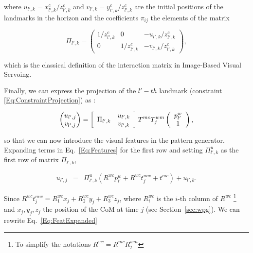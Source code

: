 where $u_{l',k} = x^{c}_{l',k} / z^{c}_{l',k}$ and $v_{l',k} = y^{c}_{l',k} / z^{c}_{l',k}$ are the initial positions of the landmarks in the horizon and the coefficients $\pi_{ij}$ the elements of the matrix

\begin{equation*}
\Pi_{l',k} = \left(
\begin{matrix}
 1/z^{c}_{l',k} & 0 & - u_{l',k} / z^{c}_{l',k} \\
 0 & 1/z^{c}_{l',k} & - v_{l',k} / z^{c}_{l',k}
\end{matrix}
\right),
\end{equation*}

which is the classical definition of the interaction matrix in Image-Based Visual Servoing.

Finally, we can express the projection of the $l'-th$ landmark (constraint \ref{Eq:ConstraintProjection}) as :

\begin{equation}
\label{Eq:Features}
 \left(
 \begin{matrix}
  u_{l',j} \\
  v_{l',j}
 \end{matrix}
 \right) = 
\left[
\begin{array}{cc}
\multirow{2}{*}{$\Pi_{l',k}$} & u_{l',k} \\
& v_{l',k} \\
\end{array}
\right]
 T^{mc} T^{wm}_j \left( \begin{array}{c}
 p^{w}_{l'}\\
 1
 \end{array}\right),
\end{equation}

so that we can now introduce the visual features in the pattern generator. Expanding terms in Eq.~\ref{Eq:Features} for the first row and setting $\Pi^u_{l',k}$ as the first row of matrix $\Pi_{l',k}$,

\begin{eqnarray}
\label{Eq:FeatExpanded}
 u_{l',j} &= &\Pi^u_{l',k} (R^{wc} p^{w}_{l'} + R^{wc} t^{mw}_j + t^{mc}) + u_{l',k}.
\end{eqnarray}

Since $R^{wc} t^{mw}_j = R^{wc}_1 x_j + R^{wc}_2 y_j + R^{wc}_3 z_j$, where $R^{wc}_i$ is the $i$-th column of $R^{wc}$
\footnote{To simplify the notations $R^{wc}=R^{mc}R_j^{wm}$}
and $x_j,y_j,z_j$ the position of the CoM at time $j$ (see Section~\ref{sec:wpg}). We can rewrite Eq.~\ref{Eq:FeatExpanded}


